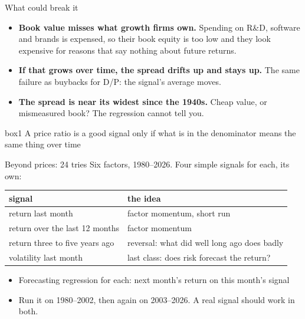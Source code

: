 \documentclass[aspectratio=169,10pt]{beamer}
\begin{document}
\begin{frame}{What could break it}
\vskip 8pt
\begin{itemize}
\item \textbf{Book value misses what growth firms own.} Spending on R\&D, software and brands is expensed, so their book equity is too low and they look expensive for reasons that say nothing about future returns.
\vskip 10pt
\item \textbf{If that grows over time, the spread drifts up and stays up.} The same failure as buybacks for D/P: the signal's average moves.
\vskip 10pt
\item \textbf{The spread is near its widest since the 1940s.} Cheap value, or mismeasured book? The regression cannot tell you.
\end{itemize}
\vskip 14pt
\begin{beamercolorbox}[rounded=true,sep=7pt,center]{box1}
A price ratio is a good signal only if what is in the denominator means the same thing over time
\end{beamercolorbox}
\end{frame}

\begin{frame}{Beyond prices: 24 tries}
\vskip 4pt
Six factors, 1980--2026. Four simple signals for each, its own:
\vskip 8pt
\begin{center}
\renewcommand{\arraystretch}{1.3}
\begin{tabular}{ll}
\toprule
signal & the idea \\
\midrule
return last month & factor momentum, short run \\
return over the last 12 months & factor momentum \\
return three to five years ago & reversal: what did well long ago does badly \\
volatility last month & last class: does risk forecast the return? \\
\bottomrule
\end{tabular}
\end{center}
\vskip 10pt
\begin{itemize}
\item Forecasting regression for each: next month's return on this month's signal
\vskip 4pt
\item Run it on 1980--2002, then again on 2003--2026. A real signal should work in both.
\end{itemize}
\end{frame}
\end{document}
